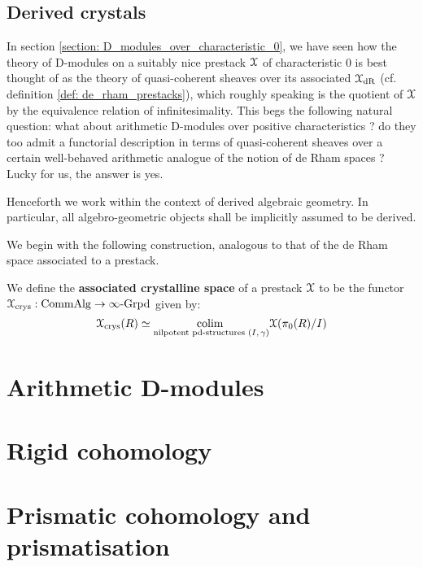         \subsection{Derived crystals}
            In section \ref{section: D_modules_over_characteristic_0}, we have seen how the theory of D-modules on a suitably nice prestack $\mathcal{X}$ of characteristic $0$ is best thought of as the theory of quasi-coherent sheaves over its associated  $\mathcal{X}_{\mathrm{dR}}$ (cf. definition \ref{def: de_rham_prestacks}), which roughly speaking is the quotient of $\mathcal{X}$ by the equivalence relation of infinitesimality. This begs the following natural question: what about arithmetic D-modules over positive characteristics ? do they too admit a functorial description in terms of quasi-coherent sheaves over a certain well-behaved arithmetic analogue of the notion of de Rham spaces ? Lucky for us, the answer is yes.
                
            \begin{convention}
                Henceforth we work within the context of derived algebraic geometry. In particular, all algebro-geometric objects shall be implicitly assumed to be derived.
            \end{convention}
            
            We begin with the following construction, analogous to that of the de Rham space associated to a prestack.
            \begin{definition} \label{def: crystalline_space}
                We define the \textbf{associated crystalline space} of a prestack $\mathcal{X}$ to be the functor $\mathcal{X}_{\mathrm{crys}}: \mathrm{Comm}\mathrm{Alg} \to \infty\text{-}\mathrm{Grpd}$ given by:
                    $$\mathcal{X}_{\mathrm{crys}}(R) \simeq \underset{\text{nilpotent pd-structures $(I, \gamma)$}}{\operatorname{colim} \:} \mathcal{X}(\pi_0(R)/I)$$
            \end{definition}
        
    \section{Arithmetic D-modules}
    
    \section{Rigid cohomology}
        
    \section{Prismatic cohomology and prismatisation}
